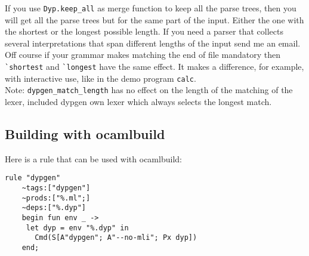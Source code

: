 \documentclass[12pt]{article}
\begin{document}
{If you use \verb|Dyp.keep_all| as merge function to keep all the parse trees, then you will get all the parse trees but for the same part of the input. Either the one with the shortest or the longest possible length. If you need a parser that collects several interpretations that span different lengths of the input send me an email.\\

Off course if your grammar makes matching the end of file mandatory then \verb|`shortest| and \verb|`longest| have the same effect. It makes a difference, for example, with interactive use, like in the demo program \verb|calc|.\\

Note: \verb|dypgen_match_length| has no effect on the length of the matching of the lexer, included dypgen own lexer which always selects the longest match.

\subsection{Building with ocamlbuild}

Here is a rule that can be used with ocamlbuild:
\begin{verbatim}
rule "dypgen"
    ~tags:["dypgen"]
    ~prods:["%.ml";]
    ~deps:["%.dyp"]
    begin fun env _ ->
     let dyp = env "%.dyp" in
       Cmd(S[A"dypgen"; A"--no-mli"; Px dyp])
    end;
\end{verbatim}




}
\end{document}
